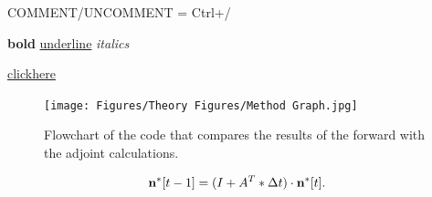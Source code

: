 COMMENT/UNCOMMENT = Ctrl+/

\textbf{bold} 
\underline{underline} 
\textit{italics}

\href{http://www.google.nl}{clickhere}



\begin{figure}[h]
    \centering
    \texttt{[image: Figures/Theory Figures/Method Graph.jpg]}
    \caption{\centering Flowchart of the code that compares the results of the forward with the adjoint calculations.}
    \label{fig:flowchart}
\end{figure}


\begin{figure}[H]
    \centering
    \label{fig:foobar}
\end{figure}


\begin{equation}
    \centering
    \textbf{n}^*[t-1] = (I + A^T*\Delta t) \cdot \textbf{n}^*[t].
\end{equation}


